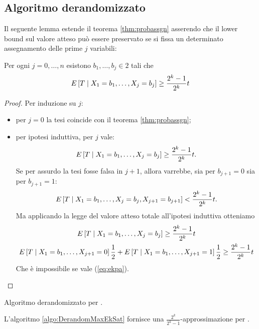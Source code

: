 \subsection{Algoritmo derandomizzato}
Il seguente lemma estende il teorema \ref{thm:probassgn} asserendo che il lower bound sul valore atteso può essere preservato se si fissa un determinato assegnamento delle prime $j$ variabili:
\begin{theorem}\label{thm:maxsatderandomexv}
	Per ogni $j=0,\dots,n$ esistono $b_1,\dots,b_j\in2$ tali che
	\begin{equation*}
		E\left[T\mid X_1=b_1,\dots,X_j=b_j\right] \geq \frac{2^k-1}{2^k}t
	\end{equation*}
\end{theorem}
\begin{proof}
	Per induzione su $j$:
	\begin{itemize}
		\item per $j=0$ la tesi coincide con il teorema \ref{thm:probassgn};
		\item per ipotesi induttiva, per $j$ vale:
		      \begin{equation*}
			      E\left[T\mid X_1=b_1,\dots,X_j=b_j\right]\geq\frac{2^k-1}{2^k}t \text.
		      \end{equation*}
		      Se per assurdo la tesi fosse falsa in $j+1$, allora varrebbe, sia per $b_{j+1}=0$ sia per $b_{j+1}=1$:
		      \begin{equation}\label{eq:ekpa}
			      E\left[T\mid X_1=b_1,\dots,X_j=b_j,X_{j+1}=b_{j+1}\right]<\frac{2^k-1}{2^k}t \text.
		      \end{equation}
		      Ma applicando la legge del valore atteso totale all'ipotesi induttiva otteniamo
		      \begin{gather*}
			      E\left[T\mid X_1=b_1,\dots,X_j=b_j\right] \geq \frac{2^k-1}{2^k}t \\
			      E\left[T\mid X_1=b_1,\dots,X_{j+1}=0\right]\frac12 + E\left[T\mid X_1=b_1,\dots,X_{j+1}=1\right]\frac12 \geq \frac{2^k-1}{2^k}t
		      \end{gather*}
		      Che è impossibile se vale (\ref{eq:ekpa}).
	\end{itemize}
\end{proof}

\begin{algorithm}[ht]
	\caption{Algoritmo derandomizzato per \MaxEkSat.}
	\label{algo:DerandomMaxEkSat}
	
\end{algorithm}

\begin{theorem}
	L'algoritmo \ref{algo:DerandomMaxEkSat} fornisce una $\frac{2^k}{2^k -1}$-approssimazione per \MaxEkSat.
\end{theorem}

